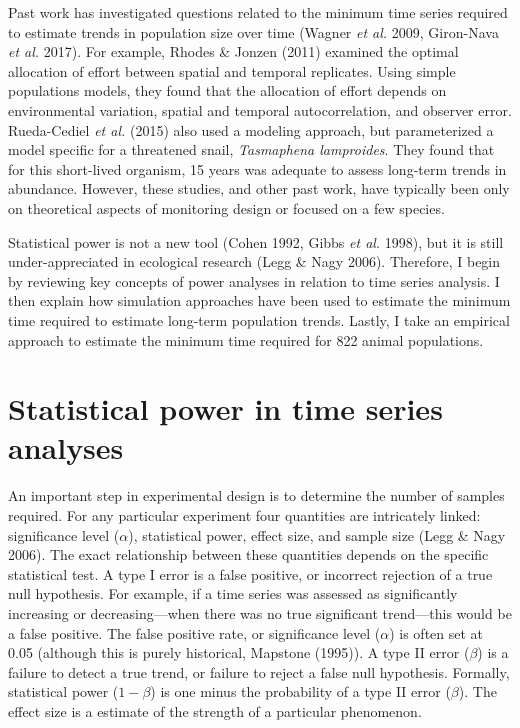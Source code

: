 \documentclass[12pt,]{article}
\begin{document}
Past work has investigated questions related to the minimum time series
required to estimate trends in population size over time (Wagner
\emph{et al.} 2009, Giron-Nava \emph{et al.} 2017). For example, Rhodes
\& Jonzen (2011) examined the optimal allocation of effort between
spatial and temporal replicates. Using simple populations models, they
found that the allocation of effort depends on environmental variation,
spatial and temporal autocorrelation, and observer error. Rueda-Cediel
\emph{et al.} (2015) also used a modeling approach, but parameterized a
model specific for a threatened snail, \emph{Tasmaphena lamproides}.
They found that for this short-lived organism, 15 years was adequate to
assess long-term trends in abundance. However, these studies, and other
past work, have typically been only on theoretical aspects of monitoring
design or focused on a few species.

Statistical power is not a new tool (Cohen 1992, Gibbs \emph{et al.}
1998), but it is still under-appreciated in ecological research (Legg \&
Nagy 2006). Therefore, I begin by reviewing key concepts of power
analyses in relation to time series analysis. I then explain how
simulation approaches have been used to estimate the minimum time
required to estimate long-term population trends. Lastly, I take an
empirical approach to estimate the minimum time required for 822 animal
populations.

\section{Statistical power in time series
analyses}\label{statistical-power-in-time-series-analyses}

An important step in experimental design is to determine the number of
samples required. For any particular experiment four quantities are
intricately linked: significance level (\(\alpha\)), statistical power,
effect size, and sample size (Legg \& Nagy 2006). The exact relationship
between these quantities depends on the specific statistical test. A
type I error is a false positive, or incorrect rejection of a true null
hypothesis. For example, if a time series was assessed as significantly
increasing or decreasing---when there was no true significant
trend---this would be a false positive. The false positive rate, or
significance level (\(\alpha\)) is often set at 0.05 (although this is
purely historical, Mapstone (1995)). A type II error (\(\beta\)) is a
failure to detect a true trend, or failure to reject a false null
hypothesis. Formally, statistical power (\(1-\beta\)) is one minus the
probability of a type II error (\(\beta\)). The effect size is a
estimate of the strength of a particular phenomenon.
\end{document}

